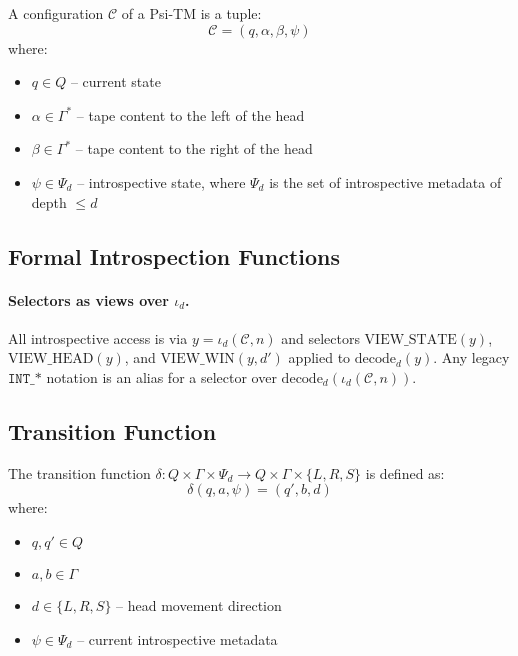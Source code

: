   \begin{definition}
  A configuration $\mathcal{C}$ of a Psi-TM is a tuple:
  $$\mathcal{C} = (q, \alpha, \beta, \psi)$$
  where:
  \begin{itemize}
  \item $q \in Q$ -- current state
  \item $\alpha \in \Gamma^*$ -- tape content to the left of the head
  \item $\beta \in \Gamma^*$ -- tape content to the right of the head
  \item $\psi \in \Psi_d$ -- introspective state, where $\Psi_d$ is the set of introspective metadata of depth $\leq d$
  \end{itemize}
  \end{definition}
  
  \subsection{Formal Introspection Functions}
  
  \paragraph{Selectors as views over $\iota_d$.}
  All introspective access is via $y=\iota_d(\mathcal{C},n)$ and selectors $\mathrm{VIEW\_STATE}(y)$, $\mathrm{VIEW\_HEAD}(y)$, and $\mathrm{VIEW\_WIN}(y,d')$ applied to $\mathrm{decode}_d(y)$. Any legacy $\texttt{INT\_*}$ notation is an alias for a selector over $\mathrm{decode}_d(\iota_d(\mathcal{C},n))$.
  
  \subsection{Transition Function}
  
  \begin{definition}
  The transition function $\delta: Q \times \Gamma \times \Psi_d \to Q \times \Gamma \times \{L, R, S\}$ is defined as:
  $$\delta(q, a, \psi) = (q', b, d)$$
  where:
  \begin{itemize}
  \item $q, q' \in Q$
  \item $a, b \in \Gamma$
  \item $d \in \{L, R, S\}$ -- head movement direction
  \item $\psi \in \Psi_d$ -- current introspective metadata
  \end{itemize}
  \end{definition}
  
